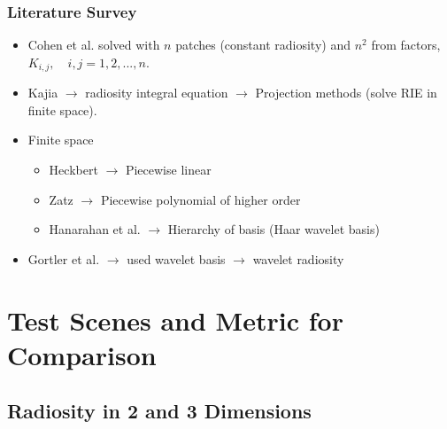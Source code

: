       \begin{frame}\frametitle{Literature Survey}

      \begin{itemize}
      \item Cohen et al. solved with $n$ patches (constant radiosity) and $n^2$ from factors, $K_{i,j}, \quad i,j =1,2,...,n.$

      \item Kajia $\rightarrow$ radiosity integral equation $\rightarrow$ Projection methods (solve RIE in finite space).

      \item Finite space
          \begin{itemize}
          \item Heckbert $\rightarrow$ Piecewise linear 
          \item Zatz $\rightarrow$ Piecewise polynomial of higher order
          \item Hanarahan et al. $\rightarrow$ Hierarchy of basis (Haar wavelet basis)
          \end{itemize}

      \item Gortler et al. $\rightarrow$ used wavelet basis $\rightarrow$ wavelet radiosity

      \end{itemize}
      \end{frame}


\section{Test Scenes and Metric for Comparison}
  \subsection{Radiosity in 2 and 3 Dimensions}


